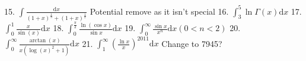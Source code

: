 \documentclass{article}
\newcommand{\dd}{\mathrm{d}}
\begin{document}
\begin{flushleft}
15. $\int \frac{\dd x}{(1+x)^{\frac{1}{3}}+(1+x)^{\frac{1}{2}}}$ Potential remove as it isn't special\newline  \newline \newline 
16. $\int_3^5 \ln{\Gamma(x)} \dd x$ \newline  \newline \newline 
17. $\int_0^1 \frac{x}{\sin(x)} \dd x$ \newline  \newline \newline 
18. $\int_0^{\frac{\pi}{2}} \frac{\ln(\cos{x})}{\sin{x}} \dd x$ \newline  \newline \newline 
19. $\int_0^{\infty} \frac{\sin{x}}{x^n} \dd x (0<n<2)$ \newline  \newline \newline 
20. $\int_0^{\infty} \frac{\arctan(x)}{x(\log(x)^2+1)} \dd x$ \newline  \newline \newline 
21. $\int_1^{\infty} \left(\frac{\ln{x}}{x}\right)^{2011} \dd x$ Change to 7945? \newline  \newline \newline 

\end{flushleft}
\end{document}
